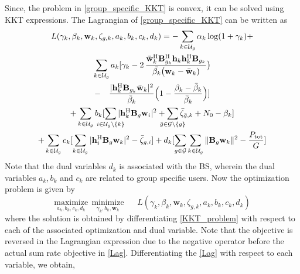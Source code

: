 \documentclass[letterpaper,conference,10pt]{IEEEtran}
\begin{document}
	Since, the problem in \eqref{group_specific_KKT} is convex, it can be solved using \ac{KKT} expressions. The Lagrangian of \eqref{group_specific_KKT} can be written as
	\begin{multline}\label{Lag}
	 L(\gamma_k, \beta_k, \mathbf{w}_k, \zeta_{g,k}, a_k, b_k, c_k, d_k) = -\sum_{k \in \mc{U}_g} \alpha_k \log({1 + \gamma_{k}}) +  \\  \sum_{k \in \mathcal{U}_g} a_k  [ \gamma_k - 2 \, \dfrac{\bar{\mathbf{w}}_{k}^{ \herm} \mbf{B}^{\herm}_{g_k} \mbf{h}_{k} \mbf{h}_{k}^{\herm} \mbf{B}_{g_k}}{\bar{\beta_k} \big( \mathbf{w}_{k} - \bar{\mathbf{w}}_{k} )}\big)  \\
	 - \quad \dfrac{|\mathbf{h}_{k}^{\herm} \mathbf{B}_{g_k} \bar{\mathbf{w}}_{k}|^2}{\bar{\beta}_{k}} \Big( 1 - \dfrac{\beta_{k} - \bar{\beta}_{k}}{\bar{\beta}_{k}} \Big)] \\ + \sum_{k \in \mathcal{U}_g} b_k [  \sum_{\mathclap{i \in \mathcal{U}_{g}\backslash \{k\} }} | \mathbf{h}_{k}^{\herm} \mathbf{B}_g \mathbf{w}_{i} |^2  + \sum_{\mathclap{\bar{g} \in {\mathcal{{G}}} \backslash \{g\}}} \bar{\zeta}_{\bar{g},k} + N_0  - \beta_k] \\ + \sum_{k \in \mathcal{U}_g} c_k [ \sum_{\substack{k \in \mathcal{U}_{{g}}}} | \mathbf{h}_{i}^{\herm} \mathbf{B}_{{g}} \mathbf{w}_{k} |^2 - \bar{\zeta}_{{g},i} ] + d_k [\sum_{g \in \mathcal{G}}\sum_{k \in \mathcal{U}_g} \|\mathbf{B}_g\mathbf{w}_{k} \|^2 - \frac{P_{\mrm{tot}}}{G}]
	\end{multline}
	Note that the dual variables $d_k$ is associated with the \ac{BS}, wherein the dual variables $a_k, b_k$ and $c_k$ are related to group specific users. Now the optimization problem is given by
	\begin{equation} \label{KKT_problem}
			\underset{a_{k}, b_{k}, c_{k}, d_k} {\text{maximize}} \, \;	\underset{\gamma_{k}, b_{k}, \mathbf{w}_{k}} {\text{minimize}} \, \, \quad \; L(\gamma_k, \beta_k, \mathbf{w}_k, \zeta_{g,k}, a_k, b_k, c_k, d_k)
	\end{equation} 
	where the solution is obtained by differentiating \eqref{KKT_problem} with respect to each of the associated optimization and dual variable. Note that the objective is reversed in the Lagrangian expression due to the negative operator before the actual sum rate objective in \eqref{Lag}.	Differentiating the \eqref{Lag} with respect to each variable, we obtain,
\end{document}
